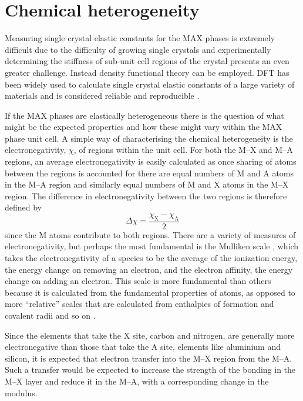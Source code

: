 \section{Chemical heterogeneity}

Measuring single crystal elastic constants for the MAX phases is extremely difficult due to the difficulty of growing single crystals and experimentally determining the stiffness of sub-unit cell regions of the crystal presents an even greater challenge. Instead density functional theory can be employed. DFT has been widely used to calculate single crystal elastic constants of a large variety of materials and is considered reliable and reproducible \cite{Lejaeghere2016}. 



If the MAX phases are elastically heterogeneous there is the question of what might be the expected properties and how these might vary within the MAX phase unit cell. A simple way of characterising the chemical heterogeneity is the electronegativity, $\chi$, of regions within the unit cell. For both the M--X and M--A regions, an average electronegativity is easily calculated as once sharing of atoms between the regions is accounted for there are equal numbers of M and A atoms in the M--A region and similarly equal numbers of M and X atoms in the M--X region. The difference in electronegativity between the two regions is therefore defined by
\begin{equation}
\Delta \chi = \frac{\chi_{\text{X}} - \chi_{\text{A}}}{2}\label{eqn:MAX_electronegativity_diff}
\end{equation}
since the M atoms contribute to both regions. There are a variety of measures of electronegativity, but perhaps the most fundamental is the Mulliken scale \cite{Mulliken1934}, which takes the electronegativity of a species to be the average of the ionization energy, the energy change on removing an electron, and the electron affinity, the energy change on adding an electron. This scale is more fundamental than others because it is calculated from the fundamental properties of atoms, as opposed to more ``relative'' scales that are calculated from enthalpies of formation and covalent radii and so on \cite{huheey1983ch3_electronegativity}.

Since the elements that take the X site, carbon and nitrogen, are generally more electronegative than those that take the A site, elements like aluminium and silicon, it is expected that electron transfer into the M--X region from the M--A. Such a transfer would be expected to increase the strength of the bonding in the M--X layer and reduce it in the M--A, with a corresponding change in the modulus.


